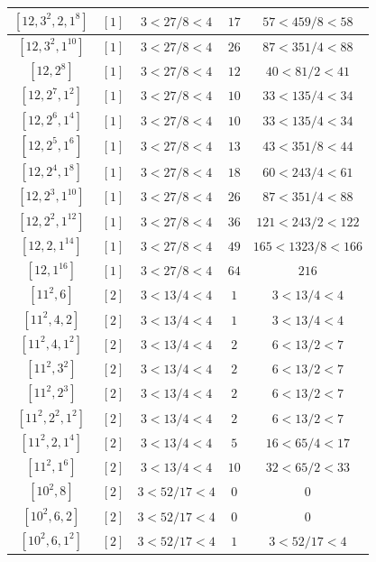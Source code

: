 \documentclass{article}%
\begin{document}
\begin{center}
\begin{longtable}{||c|c|c|c|c||}
$[12, 3^{2}, 2, 1^{8}]$ & $[1]$ & $3 < 27/8 < 4$ & $17$ & $57 < 459/8 < 58$ \\ \hline 
$[12, 3^{2}, 1^{10}]$ & $[1]$ & $3 < 27/8 < 4$ & $26$ & $87 < 351/4 < 88$ \\ \hline 
$[12, 2^{8}]$ & $[1]$ & $3 < 27/8 < 4$ & $12$ & $40 < 81/2 < 41$ \\ \hline 
$[12, 2^{7}, 1^{2}]$ & $[1]$ & $3 < 27/8 < 4$ & $10$ & $33 < 135/4 < 34$ \\ \hline 
$[12, 2^{6}, 1^{4}]$ & $[1]$ & $3 < 27/8 < 4$ & $10$ & $33 < 135/4 < 34$ \\ \hline 
$[12, 2^{5}, 1^{6}]$ & $[1]$ & $3 < 27/8 < 4$ & $13$ & $43 < 351/8 < 44$ \\ \hline 
$[12, 2^{4}, 1^{8}]$ & $[1]$ & $3 < 27/8 < 4$ & $18$ & $60 < 243/4 < 61$ \\ \hline 
$[12, 2^{3}, 1^{10}]$ & $[1]$ & $3 < 27/8 < 4$ & $26$ & $87 < 351/4 < 88$ \\ \hline 
$[12, 2^{2}, 1^{12}]$ & $[1]$ & $3 < 27/8 < 4$ & $36$ & $121 < 243/2 < 122$ \\ \hline 
$[12, 2, 1^{14}]$ & $[1]$ & $3 < 27/8 < 4$ & $49$ & $165 < 1323/8 < 166$ \\ \hline 
$[12, 1^{16}]$ & $[1]$ & $3 < 27/8 < 4$ & $64$ & $216$ \\ \hline 
$[11^{2}, 6]$ & $[2]$ & $3 < 13/4 < 4$ & $1$ & $3 < 13/4 < 4$ \\ \hline 
$[11^{2}, 4, 2]$ & $[2]$ & $3 < 13/4 < 4$ & $1$ & $3 < 13/4 < 4$ \\ \hline 
$[11^{2}, 4, 1^{2}]$ & $[2]$ & $3 < 13/4 < 4$ & $2$ & $6 < 13/2 < 7$ \\ \hline 
$[11^{2}, 3^{2}]$ & $[2]$ & $3 < 13/4 < 4$ & $2$ & $6 < 13/2 < 7$ \\ \hline 
$[11^{2}, 2^{3}]$ & $[2]$ & $3 < 13/4 < 4$ & $2$ & $6 < 13/2 < 7$ \\ \hline 
$[11^{2}, 2^{2}, 1^{2}]$ & $[2]$ & $3 < 13/4 < 4$ & $2$ & $6 < 13/2 < 7$ \\ \hline 
$[11^{2}, 2, 1^{4}]$ & $[2]$ & $3 < 13/4 < 4$ & $5$ & $16 < 65/4 < 17$ \\ \hline 
$[11^{2}, 1^{6}]$ & $[2]$ & $3 < 13/4 < 4$ & $10$ & $32 < 65/2 < 33$ \\ \hline 
$[10^{2}, 8]$ & $[2]$ & $3 < 52/17 < 4$ & $0$ & $0$ \\ \hline 
$[10^{2}, 6, 2]$ & $[2]$ & $3 < 52/17 < 4$ & $0$ & $0$ \\ \hline 
$[10^{2}, 6, 1^{2}]$ & $[2]$ & $3 < 52/17 < 4$ & $1$ & $3 < 52/17 < 4$ \\ \hline 

\end{longtable}
\end{center}
\end{document}
